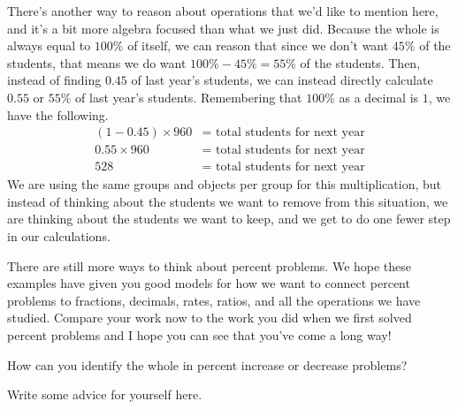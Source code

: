 \documentclass{ximera}
\begin{document}
There's another way to reason about operations that we'd like to mention here, and it's a bit more algebra focused than what we just did. Because the whole is always equal to $100\%$ of itself, we can reason that since we don't want $45\%$ of the students, that means we do want $100\% - 45\% = 55\%$ of the students. Then, instead of finding $0.45$ of last year's students, we can instead directly calculate $0.55$ or $55\%$ of last year's students. Remembering that $100\%$ as a decimal is $1$, we have the following.
\begin{align*}
(1 - 0.45) \times 960 &= \textrm{ total students for next year} \\
0.55 \times 960 &= \textrm{ total students for next year} \\
528 &= \textrm{ total students for next year}
\end{align*}
We are using the same groups and objects per group for this multiplication, but instead of thinking about the students we want to remove from this situation, we are thinking about the students we want to keep, and we get to do one fewer step in our calculations. 

There are still more ways to think about percent problems. We hope these examples have given you good models for how we want to connect percent problems to fractions, decimals, rates, ratios, and all the operations we have studied. Compare your work now to the work you did when we first solved percent problems and I hope you can see that you've come a long way!

\begin{question}
How can you identify the whole in percent increase or decrease problems?
\begin{freeResponse}
Write some advice for yourself here.
\end{freeResponse}
\end{question}
\end{document}

